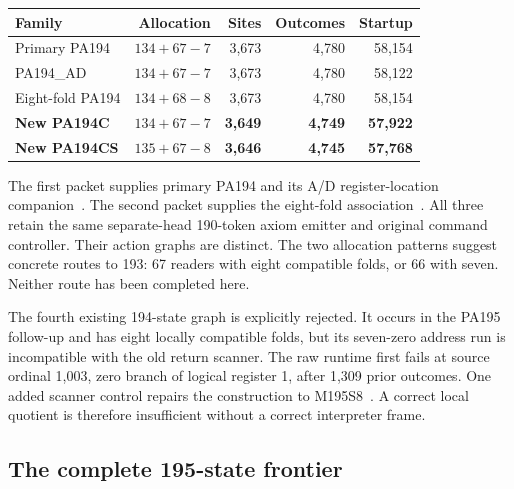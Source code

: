 \documentclass[11pt,letterpaper]{article}
\begin{document}
\begin{center}\small
\begin{tabular}{@{}lrrrr@{}}
\toprule
Family & Allocation & Sites & Outcomes & Startup\\
\midrule
Primary PA194 & $134+67-7$ &3,673&4,780&58,154\\
PA194\_AD & $134+67-7$ &3,673&4,780&58,122\\
Eight-fold PA194 & $134+68-8$ &3,673&4,780&58,154\\
\textbf{New PA194C} & $134+67-7$ &\textbf{3,649}&\textbf{4,749}&\textbf{57,922}\\
\textbf{New PA194CS} & $135+67-8$ &\textbf{3,646}&\textbf{4,745}&\textbf{57,768}\\
\bottomrule
\end{tabular}
\end{center}
The first packet supplies primary PA194 and its A/D register-location
companion~\cite{primary194}. The second packet supplies the eight-fold
association~\cite{second194}. All three retain the same separate-head
190-token axiom emitter and original command controller. Their action
graphs are distinct. The two allocation patterns suggest concrete routes
to 193: 67 readers with eight compatible folds, or 66 with seven.
Neither route has been completed here.

The fourth existing 194-state graph is explicitly rejected. It occurs
in the PA195 follow-up and has eight locally compatible folds, but its
seven-zero address run is incompatible with the old return scanner.
The raw runtime first fails at source ordinal 1,003, zero branch of
logical register 1, after 1,309 prior outcomes. One added scanner control
repairs the construction to M195S8~\cite{followup195}. A correct local
quotient is therefore insufficient without a correct interpreter frame.

\subsection{The complete 195-state frontier}
\end{document}
